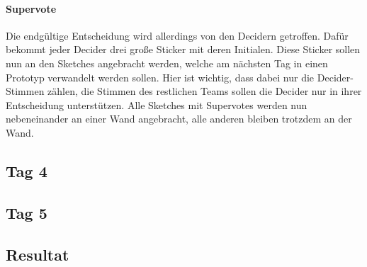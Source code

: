 \paragraph{Supervote}
Die endgültige Entscheidung wird allerdings von den Decidern getroffen. Dafür bekommt jeder Decider drei große Sticker mit deren Initialen. Diese Sticker sollen nun an den Sketches angebracht werden, welche am nächsten Tag in einen Prototyp verwandelt werden sollen. Hier ist wichtig, dass dabei nur die Decider-Stimmen zählen, die Stimmen des restlichen Teams sollen die Decider nur in ihrer Entscheidung unterstützen. Alle Sketches mit Supervotes werden nun nebeneinander an einer Wand angebracht, alle anderen bleiben trotzdem an der Wand.

\subsection*{Tag 4}

\subsection*{Tag 5}

\subsection*{Resultat}
